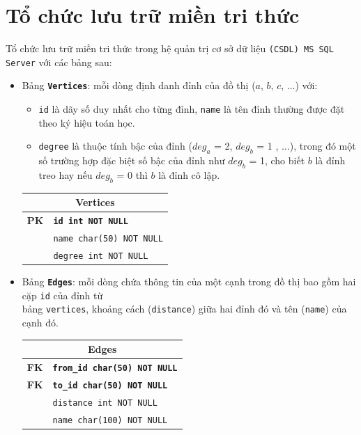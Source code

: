 \section{Tổ chức lưu trữ miền tri thức} 

Tổ chức lưu trữ miền tri thức trong hệ quản trị cơ sở dữ liệu \texttt{(CSDL) MS SQL Server} với các bảng sau:

\begin{itemize}
	\item Bảng \textbf{\texttt{Vertices}}: mỗi dòng định danh đỉnh của đồ thị ($a$, $b$, $c$, $\dots$) với:
	\begin{itemize}
		\item \texttt{id} là dãy số duy nhất cho từng đỉnh, \texttt{name} là tên đỉnh thường được đặt theo ký hiệu toán học.
		\item \texttt{degree} là thuộc tính bậc của đỉnh (${deg_a}$ = 2, ${deg_b}$ = 1 , $\dots$), trong đó một số trường hợp đặc biệt số bậc của đỉnh như ${deg_b}$ = 1, cho biết $b$ là đỉnh treo hay nếu ${deg_b}$ = 0 thì  $b$ là đỉnh cô lập.
	\end{itemize} 
	
	\begin{tabular}{|c|l|}
		\hline
		\multicolumn{2}{|c|}{\textbf{Vertices}} \\
		\hline
		\textbf{PK} & \texttt{\textbf{id int NOT NULL}} \\
		\hline
		& \texttt{name char(50) NOT NULL} \\
		\hline
		& \texttt{degree int NOT NULL} \\
		\hline
	\end{tabular}
	
	\item Bảng \textbf{\texttt{Edges}}: mỗi dòng chứa thông tin của một cạnh trong đồ thị bao gồm hai cặp \texttt{id} của đỉnh từ \\bảng \texttt{vertices}, khoảng cách (\texttt{distance}) giữa hai đỉnh đó và tên (\texttt{name}) của cạnh đó.
	
	\begin{tabular}{|c|l|}
		\hline
		\multicolumn{2}{|c|}{\textbf{Edges}} \\
		\hline
		\textbf{FK} & \texttt{\textbf{from\_id char(50) NOT NULL}} \\
		\hline
		\textbf{FK} & \texttt{\textbf{to\_id char(50) NOT NULL}} \\
		\hline
		& \texttt{distance int NOT NULL} \\
		\hline
		& \texttt{name char(100) NOT NULL} \\
		\hline
	\end{tabular}
\end{itemize}
	

